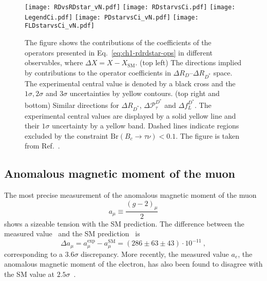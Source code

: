 \begin{figure}
\centering
\texttt{[image: RDvsRDstar\_vN.pdf]}
\texttt{[image: RDstarvsCi.pdf]}
\texttt{[image: LegendCi.pdf]}
\texttt{[image: PDstarvsCi\_vN.pdf]}
\texttt{[image: FLDstarvsCi\_vN.pdf]}
\caption[Individual contributions of the Wilson coefficients of the WET
Hamiltonian in different observables ($\Delta X \equiv X-X_{\text{SM}}$):
correlation between $\Delta {\cal R}_D$ and $\Delta {\cal R}_{D^*}$, and
$\Delta \mathcal{R}_{D^*}$, $\Delta \mathcal{P}_\tau^{D^{*}}$ and
$\Delta {\cal F}_L^{D^{*}}$ as a function of the Wilson coefficients.]{The
  figure shows the contributions of the coefficients of the operators presented
  in Eq.~\eqref{eq:ch1-rdrdstar-ops} in different observables, where
  $\Delta X = X - X_{\text{SM}}$. (top left) The directions implied by
  contributions to the operator coefficients in
  $\Delta R_{D}$--$\Delta R_{D^{*}}$ space. The experimental central value is
  denoted by a black cross and the $1\sigma, 2\sigma$ and $3\sigma$
  uncertainties by yellow contours. (top right and bottom) Similar directions
  for $\Delta R_{D^{*}}$, $\Delta \mathcal{P}_{\tau}^{D^{*}}$ and
  $\Delta f_{L}^{D^{*}}$. The experimental central values are displayed by a
  solid yellow line and their $1\sigma$ uncertainty by a yellow band. Dashed
  lines indicate regions excluded by the constraint
  $\mathrm{Br}(B_c \to \tau \nu) < 0.1$. The figure is taken from
  Ref.~\cite{Murgui:2019czp}.}
\label{fig:ch1-rd-rdstar-fit}
\end{figure}

\subsection{Anomalous magnetic moment of the muon}

The most precise measurement of the anomalous magnetic moment of the muon
\begin{equation}
  a_{\mu} \equiv \frac{(g-2)_{\mu}}{2}
\end{equation}
shows a sizeable tension with the SM prediction. The difference between the
measured value~\cite{Chapelain:2017syu, Blum:2013xva} and the SM
prediction~\cite{Davier:2010nc} is
\begin{equation}
\Delta a_\mu= a_\mu^{\text{exp}} - a_\mu^{\text{SM}}= (286 \pm 63 \pm 43) \cdot 10^{-11} \ ,
\end{equation}
corresponding to a $3.6\sigma$ discrepancy. More recently, the measured value
$a_{e}$, the anomalous magnetic moment of the electron, has also been found to
disagree with the SM value at $2.5\sigma$~\cite{Articleparker}.
